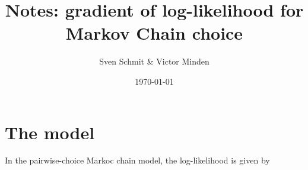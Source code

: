\title{Notes: gradient of log-likelihood for Markov Chain choice}
\author{Sven Schmit \& Victor Minden}
\date{\today}



    \maketitle
    \section{The model}
    In the pairwise-choice Markoc chain model, the log-likelihood is given by
    \begin{align*}

    \end{align*}

    
    


